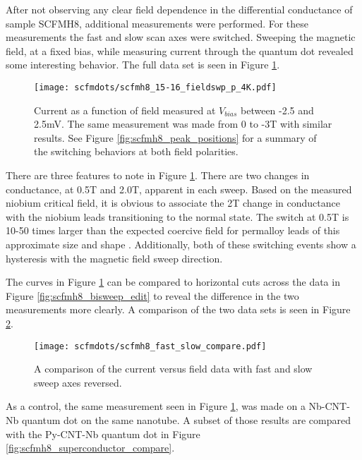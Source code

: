 After not observing any clear field dependence in the differential conductance of sample SCFMH8, additional measurements were performed. For these measurements the fast and slow scan axes were switched. Sweeping the magnetic field, at a fixed bias, while measuring current through the quantum dot revealed some interesting behavior. The full data set is seen in Figure \ref{fig:scfmh8_positive_field_switching}.

\begin{figure}
    \centering
    \texttt{[image: scfmdots/scfmh8\_15-16\_fieldswp\_p\_4K.pdf]}
    \caption{Current as a function of field measured at $V_{bias}$ between -2.5 and 2.5mV. The same measurement was made from 0 to -3T with similar results. See Figure \ref{fig:scfmh8_peak_positions} for a summary of the switching behaviors at both field polarities.}
    \label{fig:scfmh8_positive_field_switching}
\end{figure}

There are three features to note in Figure \ref{fig:scfmh8_positive_field_switching}. There are two changes in conductance, at 0.5T and 2.0T, apparent in each sweep. Based on the measured niobium critical field, it is obvious to associate the 2T change in conductance with the niobium leads transitioning to the normal state. The switch at 0.5T is 10-50 times larger than the expected coercive field for permalloy leads of this approximate size and shape \cite{Aurich2010, Preusche2009}. Additionally, both of these switching events show a hysteresis with the magnetic field sweep direction. 

The curves in Figure \ref{fig:scfmh8_positive_field_switching} can be compared to horizontal cuts across the data in Figure \ref{fig:scfmh8_bisweep_edit} to reveal the difference in the two measurements more clearly. A comparison of the two data sets is seen in Figure \ref{fig:scfmh8_fast_slow_compare}. 

\begin{figure}
    \centering
    \texttt{[image: scfmdots/scfmh8\_fast\_slow\_compare.pdf]}
    \caption{A comparison of the current versus field data with fast and slow sweep axes reversed.}
    \label{fig:scfmh8_fast_slow_compare}
\end{figure}

As a control, the same measurement seen in Figure \ref{fig:scfmh8_positive_field_switching},  was made on a Nb-CNT-Nb quantum dot on the same nanotube. A subset of those results are compared with the Py-CNT-Nb quantum dot in Figure \ref{fig:scfmh8_superconductor_compare}.

